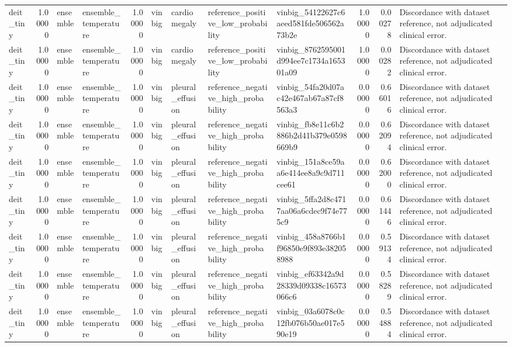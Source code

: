 \begin{tabular}{lrllrllllrrl}
deit\_tiny & 1.00000 & ensemble & ensemble\_temperature & 1.00000 & vinbig & cardiomegaly & reference\_positive\_low\_probability & vinbig\_54122627c6aeed581fde506562a73b2e & 1.00000 & 0.00278 & Discordance with dataset reference, not adjudicated clinical error. \\
deit\_tiny & 1.00000 & ensemble & ensemble\_temperature & 1.00000 & vinbig & cardiomegaly & reference\_positive\_low\_probability & vinbig\_8762595001d994ee7c1734a165301a09 & 1.00000 & 0.00282 & Discordance with dataset reference, not adjudicated clinical error. \\
deit\_tiny & 1.00000 & ensemble & ensemble\_temperature & 1.00000 & vinbig & pleural\_effusion & reference\_negative\_high\_probability & vinbig\_54fa20d07ac42e467ab67a87cf8563a3 & 0.00000 & 0.66016 & Discordance with dataset reference, not adjudicated clinical error. \\
deit\_tiny & 1.00000 & ensemble & ensemble\_temperature & 1.00000 & vinbig & pleural\_effusion & reference\_negative\_high\_probability & vinbig\_fb8e11c6b2886b2d41b379e0598669b9 & 0.00000 & 0.62094 & Discordance with dataset reference, not adjudicated clinical error. \\
deit\_tiny & 1.00000 & ensemble & ensemble\_temperature & 1.00000 & vinbig & pleural\_effusion & reference\_negative\_high\_probability & vinbig\_151a8ce59aa6e414ee8a9c9d711cee61 & 0.00000 & 0.62000 & Discordance with dataset reference, not adjudicated clinical error. \\
deit\_tiny & 1.00000 & ensemble & ensemble\_temperature & 1.00000 & vinbig & pleural\_effusion & reference\_negative\_high\_probability & vinbig\_5ffa2d8c4717aa06a6cdec9f74e775c9 & 0.00000 & 0.61446 & Discordance with dataset reference, not adjudicated clinical error. \\
deit\_tiny & 1.00000 & ensemble & ensemble\_temperature & 1.00000 & vinbig & pleural\_effusion & reference\_negative\_high\_probability & vinbig\_458a8766b1f96850e9f893e382058988 & 0.00000 & 0.59134 & Discordance with dataset reference, not adjudicated clinical error. \\
deit\_tiny & 1.00000 & ensemble & ensemble\_temperature & 1.00000 & vinbig & pleural\_effusion & reference\_negative\_high\_probability & vinbig\_ef63342a9d28339d09338c16573066c6 & 0.00000 & 0.58289 & Discordance with dataset reference, not adjudicated clinical error. \\
deit\_tiny & 1.00000 & ensemble & ensemble\_temperature & 1.00000 & vinbig & pleural\_effusion & reference\_negative\_high\_probability & vinbig\_03a6078c0c12fb076b50ae017e590e19 & 0.00000 & 0.54884 & Discordance with dataset reference, not adjudicated clinical error. \\

\end{tabular}

